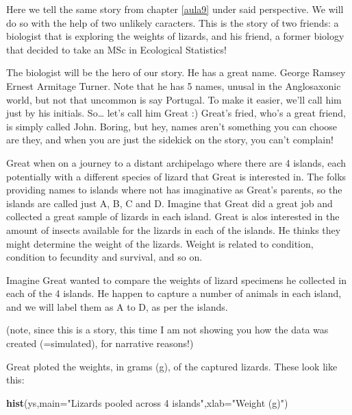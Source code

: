 \documentclass[
]{book}
\newenvironment{Shaded}{\begin{snugshade}}{\end{snugshade}}
\newcommand{\DataTypeTok}[1]{\textcolor[rgb]{0.13,0.29,0.53}{#1}}
\newcommand{\KeywordTok}[1]{\textcolor[rgb]{0.13,0.29,0.53}{\textbf{#1}}}
\newcommand{\NormalTok}[1]{#1}
\newcommand{\StringTok}[1]{\textcolor[rgb]{0.31,0.60,0.02}{#1}}
\begin{document}
Here we tell the same story from chapter \ref{aula9} under said perspective. We will do so with the help of two unlikely caracters. This is the story of two friends: a biologist that is exploring the weights of lizards, and his friend, a former biology that decided to take an MSc in Ecological Statistics!

The biologist will be the hero of our story. He has a great name. George Ramsey Ernest Armitage Turner. Note that he has 5 names, unusal in the Anglosaxonic world, but not that uncommon is say Portugal. To make it easier, we'll call him just by his initials. So\ldots{} let's call him Great :) Great's fried, who's a great friend, is simply called John. Boring, but hey, names aren't something you can choose are they, and when you are just the sidekick on the story, you can't complain!

Great when on a journey to a distant archipelago where there are 4 islands, each potentially with a different species of lizard that Great is interested in. The folks providing names to islands where not has imaginative as Great's parents, so the islands are called just A, B, C and D. Imagine that Great did a great job and collected a great sample of lizards in each island. Great is alos interested in the amount of insects available for the lizards in each of the islands. He thinks they might determine the weight of the lizards. Weight is related to condition, condition to fecundity and survival, and so on.

Imagine Great wanted to compare the weights of lizard specimens he collected in each of the 4 islands. He happen to capture a number of animals in each island, and we will label them as A to D, as per the islands.

(note, since this is a story, this time I am not showing you how the data was created (=simulated), for narrative reasons!)

Great ploted the weights, in grams (g), of the captured lizards. These look like this:

\begin{Shaded}
\begin{Highlighting}[]
\KeywordTok{hist}\NormalTok{(ys,}\DataTypeTok{main=}\StringTok{"Lizards pooled across 4 islands"}\NormalTok{,}\DataTypeTok{xlab=}\StringTok{"Weight (g)"}\NormalTok{)}
\end{Highlighting}
\end{Shaded}
\end{document}
